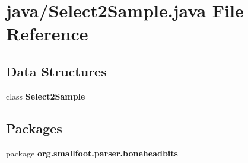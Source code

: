 \section{java/\-Select2\-Sample.java File Reference}
\label{Select2Sample_8java}
\subsection*{Data Structures}
\begin{DoxyCompactItemize}
\item 
class {\bf Select2\-Sample}
\end{DoxyCompactItemize}
\subsection*{Packages}
\begin{DoxyCompactItemize}
\item 
package {\bf org.\-smallfoot.\-parser.\-boneheadbits}
\end{DoxyCompactItemize}
